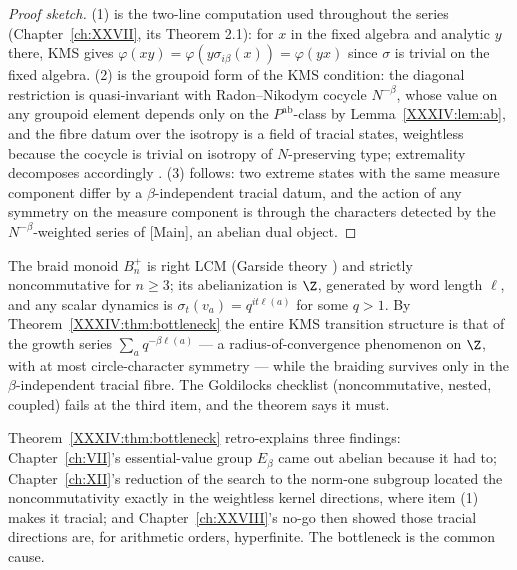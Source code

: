 \begin{proof}[Proof sketch]
(1) is the two-line computation used throughout the series (Chapter~\ref{ch:XXVII}, its Theorem
2.1): for $x$ in the fixed algebra and analytic $y$ there, KMS gives
$\varphi(xy)=\varphi(y\sigma_{i\beta}(x))=\varphi(yx)$ since $\sigma$ is trivial on the
fixed algebra. (2) is the groupoid form of the KMS condition: the diagonal restriction is
quasi-invariant with Radon--Nikodym cocycle $N^{-\beta}$, whose value on any groupoid
element depends only on the $P^{\mathrm{ab}}$-class by Lemma~\ref{XXXIV:lem:ab}, and the fibre datum
over the isotropy is a field of tracial states, weightless because the cocycle is trivial
on isotropy of $N$-preserving type; extremality decomposes accordingly \cite{Nesh13}.
(3) follows: two extreme states with the same measure component differ by a
$\beta$-independent tracial datum, and the action of any symmetry on the measure
component is through the characters detected by the $N^{-\beta}$-weighted series of
[Main], an abelian dual object.
\end{proof}

\begin{example}\label{XXXIV:ex:braid}
The braid monoid $B_n^+$ is right LCM (Garside theory \cite{Dehornoy}) and strictly
noncommutative for $n\ge3$; its abelianization is $\Z$, generated by word length
$\ell$, and any scalar dynamics is $\sigma_t(v_a)=q^{it\ell(a)}$ for some $q>1$. By
Theorem~\ref{XXXIV:thm:bottleneck} the entire KMS transition structure is that of the growth
series $\sum_aq^{-\beta\ell(a)}$ --- a radius-of-convergence phenomenon on $\Z$, with at
most circle-character symmetry --- while the braiding survives only in the
$\beta$-independent tracial fibre. The Goldilocks checklist (noncommutative, nested,
coupled) fails at the third item, and the theorem says it must.
\end{example}

\begin{remark}\label{XXXIV:rem:consistency}
Theorem~\ref{XXXIV:thm:bottleneck} retro-explains three findings: Chapter~\ref{ch:VII}'s essential-value
group $E_\beta$ came out abelian because it had to; Chapter~\ref{ch:XII}'s reduction of the search
to the norm-one subgroup located the noncommutativity exactly in the weightless kernel
directions, where item (1) makes it tracial; and Chapter~\ref{ch:XXVIII}'s no-go then showed those
tracial directions are, for arithmetic orders, hyperfinite. The bottleneck is the common
cause.
\end{remark}

